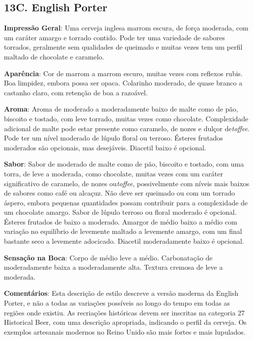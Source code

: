 \subsection*{13C. English Porter}

\textbf{Impressão Geral}: Uma cerveja inglesa marrom escura, de força moderada, com um caráter amargo e torrado contido. Pode ter uma variedade de sabores torrados, geralmente sem qualidades de queimado e muitas vezes tem um perfil maltado de chocolate e caramelo.

\textbf{Aparência}: Cor de marrom a marrom escuro, muitas vezes com reflexos rubis. Boa limpidez, embora possa ser opaca. Colarinho moderado, de quase branco a castanho claro, com retenção de boa a razoável.

\textbf{Aroma}: Aroma de moderado a moderadamente baixo de malte como de pão, biscoito e tostado, com leve torrado, muitas vezes como chocolate. Complexidade adicional de malte pode estar presente como caramelo, de nozes e dulçor de\textit{toffee}. Pode ter um nível moderado de lúpulo floral ou terroso. Ésteres frutados moderados  são opcionais, mas desejáveis. Diacetil baixo é opcional.

\textbf{Sabor}: Sabor de moderado de malte como de pão, biscoito e tostado, com uma torra, de leve a moderada, como chocolate, muitas vezes com um caráter significativo de caramelo, de nozes ou\textit{toffee}, possivelmente com níveis mais baixos de sabores como café ou alcaçuz. Não deve ser queimado ou com um torrado áspero, embora pequenas quantidades possam contribuir para a complexidade de um chocolate amargo. Sabor de lúpulo terroso ou floral moderado é opcional. Ésteres frutados de baixo a moderado. Amargor de médio baixo a médio com variação no equilíbrio de levemente maltado a levemente amargo, com um final bastante seco a levemente adocicado. Diacetil moderadamente baixo é opcional.

\textbf{Sensação na Boca}: Corpo de médio leve a médio. Carbonatação de moderadamente baixa a moderadamente alta. Textura cremosa de leve a moderada.

\textbf{Comentários}: Esta descrição de estilo descreve a versão moderna da English Porter, e não a todas as variações possíveis ao longo do tempo em todas as regiões onde existiu. As recriações históricas devem ser inscritas na categoria 27 Historical Beer, com uma descrição apropriada, indicando o perfil da cerveja. Os exemplos artesanais modernos no Reino Unido são mais fortes e mais lupulados.

